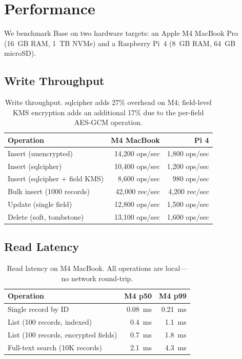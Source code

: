 \section{Performance}

\label{sec:performance}

We benchmark Base on two hardware targets: an Apple M4 MacBook Pro (16~GB RAM,
1~TB NVMe) and a Raspberry Pi~4 (8~GB RAM, 64~GB microSD).

\subsection{Write Throughput}

\begin{table}[H]
\centering
\small
\begin{tabular}{lrr}
\toprule
\textbf{Operation} & \textbf{M4 MacBook} & \textbf{Pi 4} \\
\midrule
Insert (unencrypted) & 14,200 ops/sec & 1,800 ops/sec \\
Insert (sqlcipher) & 10,400 ops/sec & 1,200 ops/sec \\
Insert (sqlcipher + field KMS) & 8,600 ops/sec & 980 ops/sec \\
Bulk insert (1000 records) & 42,000 rec/sec & 4,200 rec/sec \\
Update (single field) & 12,800 ops/sec & 1,500 ops/sec \\
Delete (soft, tombstone) & 13,100 ops/sec & 1,600 ops/sec \\
\bottomrule
\end{tabular}
\caption{Write throughput. sqlcipher adds 27\% overhead on M4; field-level KMS
encryption adds an additional 17\% due to the per-field AES-GCM operation.}
\label{tab:writes}
\end{table}

\subsection{Read Latency}

\begin{table}[H]
\centering
\small
\begin{tabular}{lrr}
\toprule
\textbf{Operation} & \textbf{M4 p50} & \textbf{M4 p99} \\
\midrule
Single record by ID & 0.08~ms & 0.21~ms \\
List (100 records, indexed) & 0.4~ms & 1.1~ms \\
List (100 records, encrypted fields) & 0.7~ms & 1.8~ms \\
Full-text search (10K records) & 2.1~ms & 4.3~ms \\
\bottomrule
\end{tabular}
\caption{Read latency on M4 MacBook. All operations are local---no network
round-trip.}
\label{tab:reads}
\end{table}

